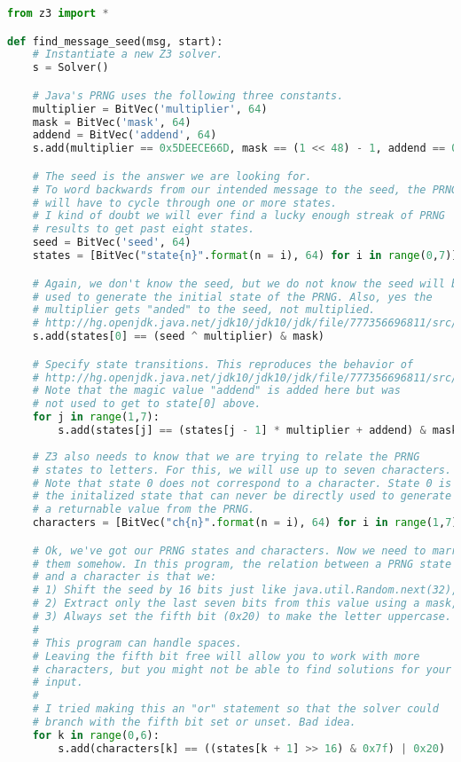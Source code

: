 \documentclass[12pt]{article}
\begin{document}
\begin{lstlisting}[language=Python]
from z3 import *

def find_message_seed(msg, start):
    # Instantiate a new Z3 solver.
    s = Solver()

    # Java's PRNG uses the following three constants.
    multiplier = BitVec('multiplier', 64)
    mask = BitVec('mask', 64)
    addend = BitVec('addend', 64)
    s.add(multiplier == 0x5DEECE66D, mask == (1 << 48) - 1, addend == 0xB)

    # The seed is the answer we are looking for.
    # To word backwards from our intended message to the seed, the PRNG
    # will have to cycle through one or more states.
    # I kind of doubt we will ever find a lucky enough streak of PRNG
    # results to get past eight states.
    seed = BitVec('seed', 64)
    states = [BitVec("state{n}".format(n = i), 64) for i in range(0,7)]

    # Again, we don't know the seed, but we do not know the seed will be
    # used to generate the initial state of the PRNG. Also, yes the
    # multiplier gets "anded" to the seed, not multiplied.
    # http://hg.openjdk.java.net/jdk10/jdk10/jdk/file/777356696811/src/java.base/share/classes/java/util/Random.java#l145
    s.add(states[0] == (seed ^ multiplier) & mask)

    # Specify state transitions. This reproduces the behavior of
    # http://hg.openjdk.java.net/jdk10/jdk10/jdk/file/777356696811/src/java.base/share/classes/java/util/Random.java#l203
    # Note that the magic value "addend" is added here but was
    # not used to get to state[0] above.
    for j in range(1,7):
        s.add(states[j] == (states[j - 1] * multiplier + addend) & mask)
    
    # Z3 also needs to know that we are trying to relate the PRNG
    # states to letters. For this, we will use up to seven characters.
    # Note that state 0 does not correspond to a character. State 0 is
    # the initalized state that can never be directly used to generate
    # a returnable value from the PRNG.
    characters = [BitVec("ch{n}".format(n = i), 64) for i in range(1,7)]   

    # Ok, we've got our PRNG states and characters. Now we need to marry
    # them somehow. In this program, the relation between a PRNG state
    # and a character is that we:
    # 1) Shift the seed by 16 bits just like java.util.Random.next(32),
    # 2) Extract only the last seven bits from this value using a mask,
    # 3) Always set the fifth bit (0x20) to make the letter uppercase.
    #
    # This program can handle spaces.
    # Leaving the fifth bit free will allow you to work with more 
    # characters, but you might not be able to find solutions for your
    # input.
    #
    # I tried making this an "or" statement so that the solver could
    # branch with the fifth bit set or unset. Bad idea.
    for k in range(0,6):
        s.add(characters[k] == ((states[k + 1] >> 16) & 0x7f) | 0x20)
    

\end{lstlisting}
\end{document}
